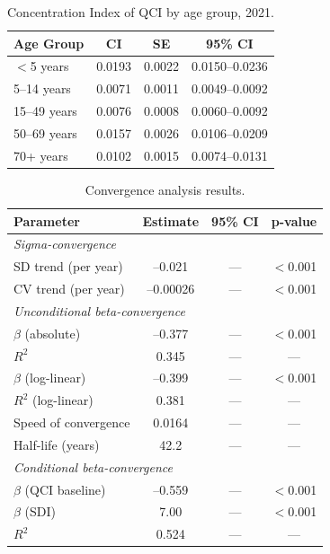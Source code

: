 \documentclass[12pt]{article}
\begin{document}
\clearpage

\begin{table}[htbp]
\centering
\caption{Concentration Index of QCI by age group, 2021.}
\label{tab:table3}
\begin{tabular}{lccc}
\toprule
Age Group & CI & SE & 95\% CI \\
\midrule
$<$5 years & 0.0193 & 0.0022 & 0.0150--0.0236 \\
5--14 years & 0.0071 & 0.0011 & 0.0049--0.0092 \\
15--49 years & 0.0076 & 0.0008 & 0.0060--0.0092 \\
50--69 years & 0.0157 & 0.0026 & 0.0106--0.0209 \\
70+ years & 0.0102 & 0.0015 & 0.0074--0.0131 \\
\bottomrule
\end{tabular}
\end{table}

\clearpage

\begin{table}[htbp]
\centering
\caption{Convergence analysis results.}
\label{tab:table4}
\begin{tabular}{lccc}
\toprule
Parameter & Estimate & 95\% CI & p-value \\
\midrule
\multicolumn{4}{l}{\textit{Sigma-convergence}} \\
\midrule
SD trend (per year) & --0.021 & --- & $<$0.001 \\
CV trend (per year) & --0.00026 & --- & $<$0.001 \\
\midrule
\multicolumn{4}{l}{\textit{Unconditional beta-convergence}} \\
\midrule
$\beta$ (absolute) & --0.377 & --- & $<$0.001 \\
$R^2$ & 0.345 & --- & --- \\
$\beta$ (log-linear) & --0.399 & --- & $<$0.001 \\
$R^2$ (log-linear) & 0.381 & --- & --- \\
Speed of convergence & 0.0164 & --- & --- \\
Half-life (years) & 42.2 & --- & --- \\
\midrule
\multicolumn{4}{l}{\textit{Conditional beta-convergence}} \\
\midrule
$\beta$ (QCI baseline) & --0.559 & --- & $<$0.001 \\
$\beta$ (SDI) & 7.00 & --- & $<$0.001 \\
$R^2$ & 0.524 & --- & --- \\
\bottomrule
\end{tabular}
\end{table}
\end{document}
